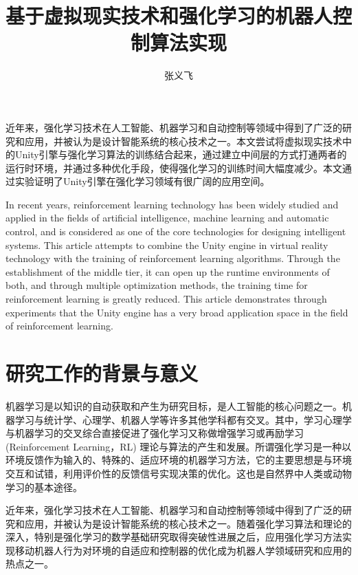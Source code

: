 \documentclass[bachelor]{thesis-uestc}
\title{基于虚拟现实技术和强化学习的机器人控制算法实现}
\author{张义飞}
\begin{document}
	
	\begin{chineseabstract}
		近年来，强化学习技术在人工智能、机器学习和自动控制等领域中得到了广泛的研究和应用，并被认为是设计智能系统的核心技术之一。本文尝试将虚拟现实技术中的Unity引擎与强化学习算法的训练结合起来，通过建立中间层的方式打通两者的运行时环境，并通过多种优化手段，使得强化学习的训练时间大幅度减少。本文通过实验证明了Unity引擎在强化学习领域有很广阔的应用空间。
		
	\end{chineseabstract}
	
	\begin{englishabstract}
		In recent years, reinforcement learning technology has been widely studied and applied in the fields of artificial intelligence, machine learning and automatic control, and is considered as one of the core technologies for designing intelligent systems. This article attempts to combine the Unity engine in virtual reality technology with the training of reinforcement learning algorithms. Through the establishment of the middle tier, it can open up the runtime environments of both, and through multiple optimization methods, the training time for reinforcement learning is greatly reduced. This article demonstrates through experiments that the Unity engine has a very broad application space in the field of reinforcement learning.
		
	\end{englishabstract}
	
	\thesistableofcontents
	
	\thesischapterexordium
	
	\section{研究工作的背景与意义}
	
	机器学习是以知识的自动获取和产生为研究目标，是人工智能的核心问题之一。机器学习与统计学、心理学、机器人学等许多其他学科都有交叉。其中，学习心理学与机器学习的交叉综合直接促进了强化学习又称做增强学习或再励学习(Reinforcement Learning，RL) 理论与算法的产生和发展。所谓强化学习是一种以环境反馈作为输入的、特殊的、适应环境的机器学习方法，它的主要思想是与环境交互和试错，利用评价性的反馈信号实现决策的优化。这也是自然界中人类或动物学习的基本途径。
	
	近年来，强化学习技术在人工智能、机器学习和自动控制等领域中得到了广泛的研究和应用，并被认为是设计智能系统的核心技术之一。随着强化学习算法和理论的深入，特别是强化学习的数学基础研究取得突破性进展之后，应用强化学习方法实现移动机器人行为对环境的自适应和控制器的优化成为机器人学领域研究和应用的热点之一。
	
\end{document}
